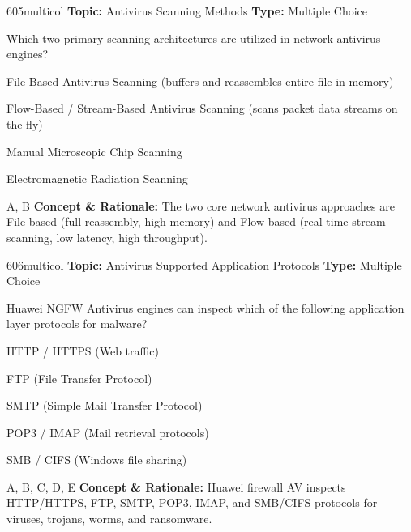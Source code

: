 \begin{qcard}{605}{multicol}
\textcolor{darkslate!75}{\small\textbf{Topic:} Antivirus Scanning Methods \hfill \textbf{Type:} Multiple Choice}\vspace{0.4em}\par
Which two primary scanning architectures are utilized in network antivirus engines?
\begin{qoptions}
\item File-Based Antivirus Scanning (buffers and reassembles entire file in memory)
\item Flow-Based / Stream-Based Antivirus Scanning (scans packet data streams on the fly)
\item Manual Microscopic Chip Scanning
\item Electromagnetic Radiation Scanning
\end{qoptions}
\end{qcard}
\nopagebreak
\begin{explainbox}{A, B}
\textbf{Concept \& Rationale:} The two core network antivirus approaches are File-based (full reassembly, high memory) and Flow-based (real-time stream scanning, low latency, high throughput).
\end{explainbox}

\begin{qcard}{606}{multicol}
\textcolor{darkslate!75}{\small\textbf{Topic:} Antivirus Supported Application Protocols \hfill \textbf{Type:} Multiple Choice}\vspace{0.4em}\par
Huawei NGFW Antivirus engines can inspect which of the following application layer protocols for malware?
\begin{qoptions}
\item HTTP / HTTPS (Web traffic)
\item FTP (File Transfer Protocol)
\item SMTP (Simple Mail Transfer Protocol)
\item POP3 / IMAP (Mail retrieval protocols)
\item SMB / CIFS (Windows file sharing)
\end{qoptions}
\end{qcard}
\nopagebreak
\begin{explainbox}{A, B, C, D, E}
\textbf{Concept \& Rationale:} Huawei firewall AV inspects HTTP/HTTPS, FTP, SMTP, POP3, IMAP, and SMB/CIFS protocols for viruses, trojans, worms, and ransomware.
\end{explainbox}

